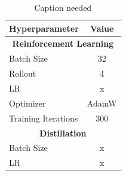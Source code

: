 \begin{table}[H]
\caption{Caption needed}
\centering
\begin{tabular}{l|c}
\toprule
Hyperparameter & Value \\
\midrule
 \multicolumn{2}{c}{\textbf{Reinforcement Learning}} \\
\midrule
Batch Size & 32 \\
Rollout & 4 \\
LR & x \\
Optimizer & AdamW \\
Training Iterations & 300 \\
\midrule
\multicolumn{2}{c}{\textbf{Distillation}} \\
\midrule
Batch Size & x \\
LR & x \\
\bottomrule
\end{tabular}
\label{tab:sft_hyperparamater}
\end{table}